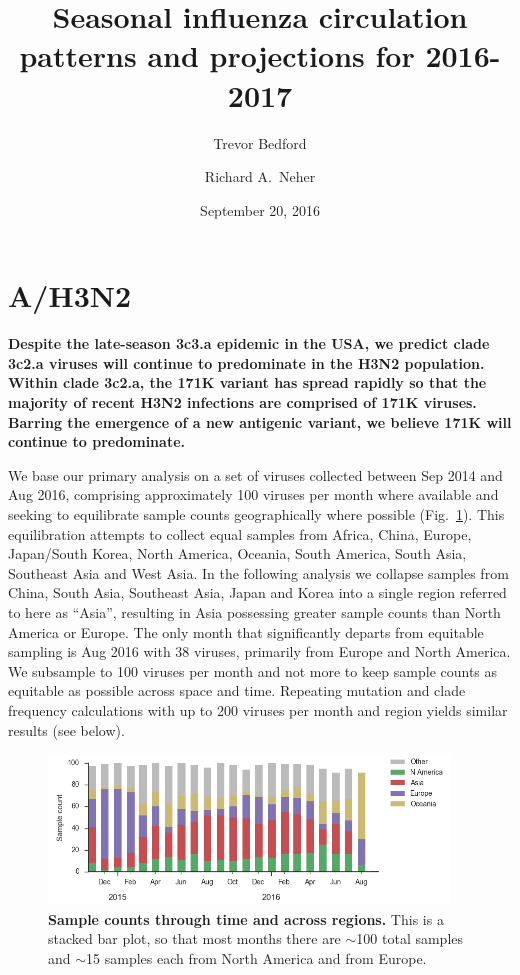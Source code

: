 \documentclass[11pt,oneside,letterpaper]{article}
\title{\vspace{2cm} \LARGE \bf
Seasonal influenza circulation patterns and projections for 2016-2017
}
\author[1]{Trevor Bedford}
\author[2]{Richard A.\ Neher}
\affil[1]{Vaccine and Infectious Disease Division, Fred Hutchinson Cancer Research Center, Seattle, WA, USA}
\affil[2]{Max Planck Institute for Developmental Biology, T\"ubingen, Germany}
\date{September 20, 2016}
\begin{document}
\maketitle

\tableofcontents

\pagebreak

\section*{A/H3N2}

\textbf{Despite the late-season 3c3.a epidemic in the USA, we predict clade 3c2.a viruses will continue to predominate in the H3N2 population. Within clade 3c2.a, the 171K variant has spread rapidly so that the majority of recent H3N2 infections are comprised of 171K viruses. Barring the emergence of a new antigenic variant, we believe 171K will continue to predominate.}

We base our primary analysis on a set of viruses collected between Sep 2014 and Aug 2016, comprising approximately 100 viruses per month where available and seeking to equilibrate sample counts geographically where possible (Fig.\ \ref{H3N2_counts}). This equilibration attempts to collect equal samples from Africa, China, Europe, Japan/South Korea, North America, Oceania, South America, South Asia, Southeast Asia and West Asia. In the following analysis we collapse samples from China, South Asia, Southeast Asia, Japan and Korea into a single region referred to here as ``Asia'', resulting in Asia possessing greater sample counts than North America or Europe. The only month that significantly departs from equitable sampling is Aug 2016 with 38 viruses, primarily from Europe and North America. We subsample to 100 viruses per month and not more to keep sample counts as equitable as possible across space and time. Repeating mutation and clade frequency calculations with up to 200 viruses per month and region yields similar results (see below).

\begin{figure}[H]
	\centering
	\includegraphics[width=0.95\textwidth]{../figures/sep-2016/H3N2_counts.png}
	\caption{\textbf{Sample counts through time and across regions.}
	This is a stacked bar plot, so that most months there are $\sim$100 total samples and $\sim$15 samples each from North America and from Europe.
	}
	\label{H3N2_counts}
\end{figure}
\end{document}

